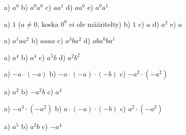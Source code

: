     \begin{tehtava}
        a) $a^0$ \qquad
        b) $a^0a^0$ \qquad
        c) $a a^1$ \qquad
        d) $aa^0$ \qquad
        e) $a^0a^1$
        
        \begin{vastaus}
            a) $1$ \quad ($a\neq0$, koska $0^0$ ei ole määritelty) \qquad
            b) $1$ \qquad
            c) $a$ \qquad
            d) $a^2$ \qquad
            e) $a$
        \end{vastaus}
    \end{tehtava}
    
    \begin{tehtava}
        a) $a^1 a a^2$ \qquad
        b) $aaaa$ \qquad
        c) $a^3ba^2$ \qquad
        d) $aba^0ba^1$
        
        \begin{vastaus}
            a) $ a^4$ \qquad
            b) $a^4$ \qquad
            c) $a^5b$ \qquad
            d) $a^2b^2$
        \end{vastaus}
    \end{tehtava}
       

    \begin{tehtava}
        a) $-a\cdot(-a)$ \qquad
        b) $-a\cdot(-a)\cdot(-b)$ \qquad
        c) $-a^2\cdot(-a^2)$
    
        \begin{vastaus}
            a) $a^2$ \qquad
            b) $-a^2b$ \qquad
            c) $a^4$
        \end{vastaus}
    \end{tehtava}

    \begin{tehtava}
        a) $-a^3\cdot(-a^2)$ \qquad
        b) $a\cdot(-a)\cdot(-b)$ \qquad
        c) $a^2\cdot(-a^2)$
        
        \begin{vastaus}
            a) $a^5$ \qquad
            b) $a^2b$ \qquad
            c) $-a^4$
        \end{vastaus}
    \end{tehtava}

